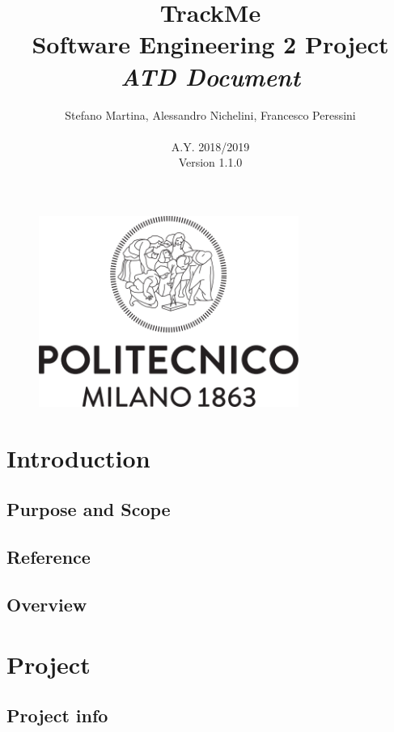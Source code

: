 \documentclass{article}
\begin{document}
\begin{figure}[t]
\centering
	\includegraphics[height=6.25cm,keepaspectratio]{Figures/logo}
\end{figure}

\title{TrackMe \\ Software Engineering 2 Project\\ \textit{ATD Document} }
\author{Stefano Martina, Alessandro Nichelini, Francesco Peressini
		\\ \\ A.Y. 2018/2019 \\ Version 1.1.0}
		
\maketitle
\newpage

\tableofcontents
\newpage

\section{Introduction}

\subsection{Purpose and Scope} 
\subsection{Reference} 
\subsection{Overview} 

\section{Project}
\subsection{Project info}
\end{document}
